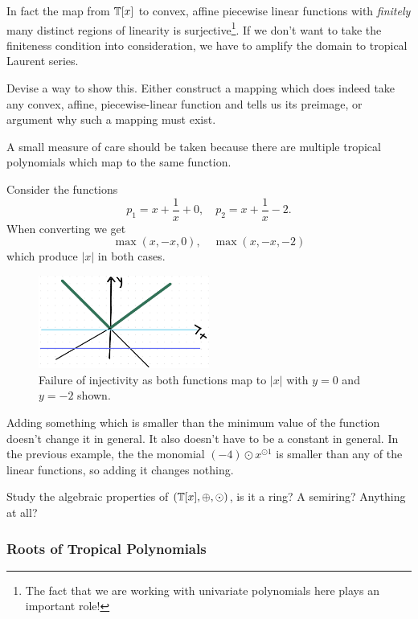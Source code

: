\documentclass[12pt]{memoir}
\begin{document}
In fact the map from $\mathbb{T}[x]$ to convex, affine piecewise linear functions with \emph{finitely} many distinct regions of linearity is surjective\footnote{The fact that we are working with univariate polynomials here plays an important role!}. If we don't want to take the finiteness condition into consideration, we have to amplify the domain to tropical Laurent series.

\begin{Ej}[5]
    Devise a way to show this. Either construct a mapping which does indeed take any convex, affine, piecewise-linear function and tells us its preimage, or argument why such a mapping must exist.
\end{Ej}

A small measure of care should be taken because there are multiple tropical polynomials which map to the same function.

\begin{Ex}
    Consider the functions 
    $$p_1=x+\frac{1}{x}+0,\quad p_2=x+\frac1x-2.$$
    When converting we get 
    $$\max(x,-x,0),\quad\max(x,-x,-2)$$
    which produce $|x|$ in both cases.
    \begin{figure}[h!]
        \centering
        \includegraphics[width=0.5\textwidth]{figs/fig3-2RenzoNotes3.png}
        \caption{Failure of injectivity as both functions map to $|x|$ with $y=0$ and $y=-2$ shown.}
        \label{fig:3.2-InjectivityFailure}
    \end{figure}
    Adding something which is smaller than the minimum value of the function doesn't change it in general. It also doesn't have to be a constant in general. In the previous example, the the monomial $(-4)\odot x^{\odot 1}$ is smaller than any of the linear functions, so adding it changes nothing.
\end{Ex}

\begin{Ej}[5]
    Study the algebraic properties of $(\mathbb{T}[x],\oplus,\odot)$, is it a ring? A semiring? Anything at all?
\end{Ej}

\subsubsection{Roots of Tropical Polynomials} %
\end{document}
